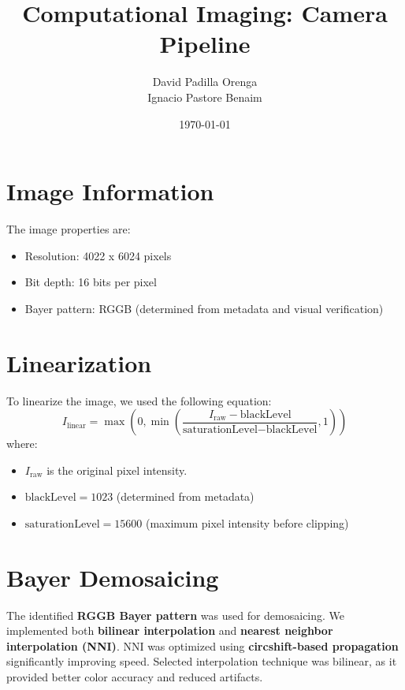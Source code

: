 \documentclass[a4paper,10pt]{article}
\title{Computational Imaging: Camera Pipeline}
\author{David Padilla Orenga \\ Ignacio Pastore Benaim}
\date{\today}
\begin{document}
\maketitle
\thispagestyle{empty}
\newpage
\setcounter{page}{1}

\section{Image Information}
The image properties are:
\begin{itemize}
    \item Resolution: 4022 x 6024 pixels
    \item Bit depth: 16 bits per pixel
    \item Bayer pattern: RGGB (determined from metadata and visual verification)
\end{itemize}

\section{Linearization}
To linearize the image, we used the following equation:
\begin{equation}
I_{\text{linear}} = \operatorname{max}\left(0, \operatorname{min}\left( \frac{I_{\text{raw}} - \text{blackLevel}}{\text{saturationLevel} - \text{blackLevel}}, 1 \right) \right)
\end{equation}
where:
\begin{itemize}
    \item $I_{\text{raw}}$ is the original pixel intensity.
    \item $\text{blackLevel} = 1023$ (determined from metadata)
    \item $\text{saturationLevel} = 15600$ (maximum pixel intensity before clipping)
\end{itemize}

\section{Bayer Demosaicing}
The identified \textbf{RGGB Bayer pattern} was used for demosaicing. We implemented both \textbf{bilinear interpolation} and \textbf{nearest neighbor interpolation (NNI)}. 
NNI was optimized using \textbf{circshift-based propagation} significantly improving speed. Selected interpolation technique was bilinear, as it provided better color accuracy and reduced artifacts.
\end{document}
